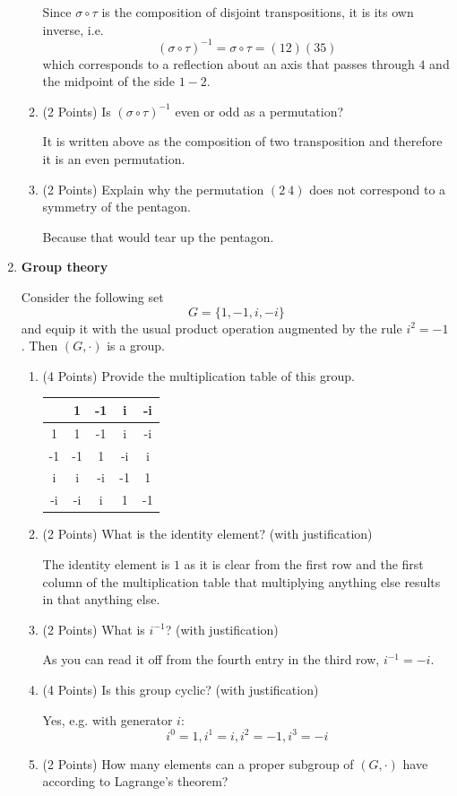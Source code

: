 \documentclass[12pt]{article}
\begin{document}
\begin{enumerate}
\begin{enumerate}
Since $\sigma\circ\tau$ is the composition of disjoint transpositions, it is its own inverse, i.e.
\[
(\sigma\circ\tau)^{-1}=\sigma\circ\tau=(1 2)(3 5)
\]
which corresponds to a reflection about an axis that passes through $4$ and the midpoint of the side $1-2$.
\item (2 Points) Is $(\sigma\circ\tau)^{-1}$ even or odd as a permutation?

It is written above as the composition of two transposition and therefore it is an even permutation.
\item (2 Points) Explain why the permutation $(2~4)$ does not correspond to a symmetry of the pentagon.

Because that would tear up the pentagon.
\end{enumerate}
\newpage
\item \textbf{Group theory} 

Consider the following set
\[
G=\{1,-1,i,-i\}
\]
and equip it with the usual product operation augmented by the rule $i^2=-1$. Then $(G,\cdot)$ is a group.

\begin{enumerate}
\item (4 Points) Provide the multiplication table of this group.

\begin{tabular}{c|cccc}
&1&-1&i&-i\\
\hline
1&1&-1&i&-i\\
-1&-1&1&-i&i\\
i&i&-i&-1&1\\
-i&-i&i&1&-1
\end{tabular}
\item (2 Points) What is the identity element? (with justification) 

The identity element is $1$ as it is clear from the first row and the first column of the multiplication table that multiplying anything else results in that anything else.
\item (2 Points) What is $i^{-1}$? (with justification) 

As you can read it off from the fourth entry in the third row, $i^{-1}=-i$.
\item (4 Points) Is this group cyclic? (with justification)

Yes, e.g. with generator $i$:
\[
i^0=1, i^1=i, i^2=-1, i^3=-i
\]
\item (2 Points) How many elements can a proper subgroup of $(G,\cdot)$ have according to Lagrange's theorem? 


\end{enumerate}
\end{enumerate}
\end{document}
